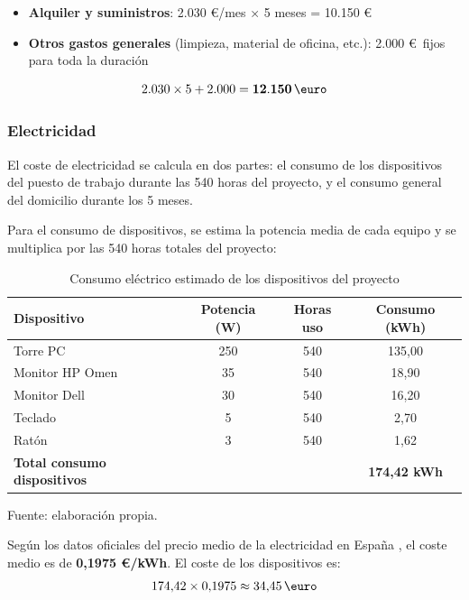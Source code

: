 \documentclass{article}
\begin{document}
    \begin{itemize}[leftmargin=*, itemsep=1pt]
    \item \textbf{Alquiler y suministros}: 2.030 \euro/mes × 5 meses = 10.150 \euro
    \item \textbf{Otros gastos generales} (limpieza, material de oficina, etc.): 
    2.000 \euro\ fijos para toda la duración
    \end{itemize}

    \[
    2.030 \times 5 + 2.000 = \mathbf{12.150} \, \text{\euro}
    \]

    \subsubsection{Electricidad}
    \normalsize
    \setlength{\parskip}{0.6em}
    \justify
    El coste de electricidad se calcula en dos partes: el consumo de los dispositivos 
    del puesto de trabajo durante las 540 horas del proyecto, y el consumo general 
    del domicilio durante los 5 meses.

    \justify
    Para el consumo de dispositivos, se estima la potencia media de cada equipo y 
    se multiplica por las 540 horas totales del proyecto:

    \begin{table}[H]
    \centering
    \begin{tabular}{lccc}
    \hline
    \textbf{Dispositivo} & \textbf{Potencia (W)} & \textbf{Horas uso} & \textbf{Consumo (kWh)} \\
    \hline
    Torre PC & 250 & 540 & 135,00 \\
    Monitor HP Omen & 35 & 540 & 18,90 \\
    Monitor Dell & 30 & 540 & 16,20 \\
    Teclado & 5 & 540 & 2,70 \\
    Ratón & 3 & 540 & 1,62 \\
    \hline
    \textbf{Total consumo dispositivos} & & & \textbf{174,42 kWh} \\
    \hline
    \end{tabular}
    \caption{Consumo eléctrico estimado de los dispositivos del proyecto}
    \label{tab:consumo_electrico}
    \footnotesize Fuente: elaboración propia.
    \end{table}

    \justify
    Según los datos oficiales del precio medio de la electricidad en España 
    \cite{noauthor_precio_nodate}, el coste medio es de \textbf{0,1975 \euro/kWh}. 
    El coste de los dispositivos es:
    \[
    174{,}42 \times 0{,}1975 \approx 34{,}45 \, \text{\euro}
    \]
\end{document}
